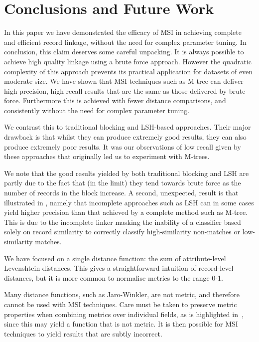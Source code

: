 \documentclass{llncs}
\begin{document}

\section{Conclusions and Future Work\label{sec-concl}}

In this paper we have demonstrated the efficacy of MSI in achieving
complete and efficient record linkage, without the need for complex
parameter tuning. In conclusion, this claim deserves some careful
unpacking. It is always possible to achieve high quality linkage using a
brute force approach. However the quadratic complexity of this approach
prevents its practical application for datasets of even moderate size.
We have shown that MSI techniques such as M-tree can deliver high
precision, high recall results that are the same as those delivered by
brute force. Furthermore this is achieved with fewer distance
comparisons, and consistently without the need for complex parameter
tuning.

We contrast this to traditional blocking and LSH-based approaches. Their
major drawback is that whilst they can produce extremely good results,
they can also produce extremely poor results. It was our observations of
low recall given by these approaches that originally led us to
experiment with M-trees.

We note that the good results yielded by both traditional blocking and
LSH are partly due to the fact that (in the limit) they tend towards
brute force as the number of records in the block increase. A second,
unexpected, result is that illustrated in
, namely that incomplete approaches
such as LSH can in some cases yield higher precision than that achieved
by a complete method such as M-tree. This is due to the incomplete
linker masking the inability of a classifier based solely on
record similarity to correctly classify high-similarity non-matches or
low-similarity matches.

We have focused on a single distance function: the sum of attribute-level Levenshtein distances. This gives a straightforward intuition of record-level distances, but it is more common to normalise metrics to the range 0-1.

Many distance functions, such as Jaro-Winkler, are not metric, and therefore cannot be used with MSI techniques. Care must be taken to preserve metric properties when combining metrics over individual fields, as is highlighted in~\cite{Yujian2007}, since this may yield a function that is not metric. It is then possible for MSI techniques to yield results that are subtly incorrect.
\end{document}
